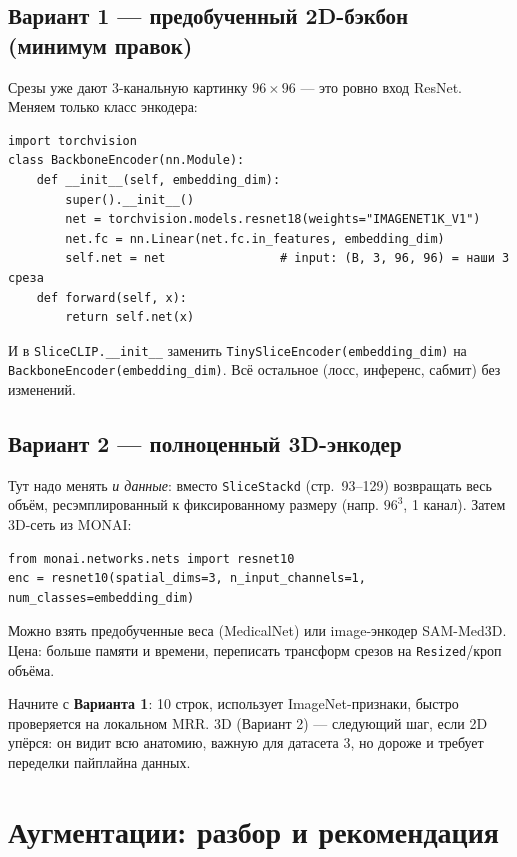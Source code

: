 \documentclass[11pt,a4paper]{article}
\begin{document}
\subsection{Вариант 1 — предобученный 2D-бэкбон (минимум правок)}

Срезы уже дают 3-канальную картинку $96{\times}96$ — это ровно вход ResNet. Меняем только класс энкодера:

\begin{verbatim}
import torchvision
class BackboneEncoder(nn.Module):
    def __init__(self, embedding_dim):
        super().__init__()
        net = torchvision.models.resnet18(weights="IMAGENET1K_V1")
        net.fc = nn.Linear(net.fc.in_features, embedding_dim)
        self.net = net                # input: (B, 3, 96, 96) = наши 3 среза
    def forward(self, x):
        return self.net(x)
\end{verbatim}

И в \texttt{SliceCLIP.\_\_init\_\_} заменить \texttt{TinySliceEncoder(embedding\_dim)} на
\texttt{BackboneEncoder(embedding\_dim)}. Всё остальное (лосс, инференс, сабмит) без изменений.

\subsection{Вариант 2 — полноценный 3D-энкодер}

Тут надо менять \emph{и данные}: вместо \texttt{SliceStackd} (стр.~93--129) возвращать весь объём,
ресэмплированный к фиксированному размеру (напр. $96^3$, 1 канал). Затем 3D-сеть из MONAI:

\begin{verbatim}
from monai.networks.nets import resnet10
enc = resnet10(spatial_dims=3, n_input_channels=1, num_classes=embedding_dim)
\end{verbatim}

Можно взять предобученные веса (MedicalNet) или image-энкодер SAM-Med3D. Цена: больше памяти и
времени, переписать трансформ срезов на \texttt{Resized}/кроп объёма.

\begin{tradeoff}
Начните с \textbf{Варианта 1}: 10 строк, использует ImageNet-признаки, быстро проверяется на
локальном MRR. 3D (Вариант 2) — следующий шаг, если 2D упёрся: он видит всю анатомию, важную для
датасета 3, но дороже и требует переделки пайплайна данных.
\end{tradeoff}

\section{Аугментации: разбор и рекомендация}
\end{document}
